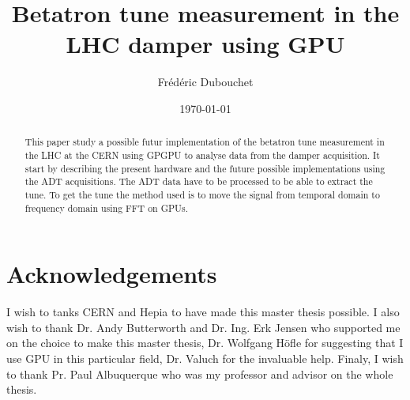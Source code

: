 \documentclass[a4paper]{report}
\title{Betatron tune measurement in the LHC damper using GPU}
\author{Fr\'ed\'eric Dubouchet}
\date{\today}
\begin{document}
\maketitle

\begin{abstract}
	This paper study a possible futur implementation of the betatron tune measurement in the \gls{LHC} at the \gls{CERN} using \gls{GPGPU} to analyse data from the \gls{damper} acquisition. It start by describing the present hardware and the future possible implementations using the \gls{ADT} acquisitions. The \gls{ADT} data have to be processed to be able to extract the \gls{tune}. To get the tune the method used is to move the signal from temporal domain to frequency domain using \gls{FFT} on \glspl{GPU}.
\end{abstract}

\chapter*{Acknowledgements}
	I wish to tanks \gls{CERN} and \gls{Hepia} to have made this master thesis possible. I also wish to thank Dr. Andy Butterworth and Dr. Ing. Erk Jensen who supported me on the choice to make this master thesis, Dr. Wolfgang H{\"o}fle for suggesting that I use GPU in this particular field, Dr. Valuch for the invaluable help. Finaly, I wish to thank Pr. Paul Albuquerque who was my professor and advisor on the whole thesis.

\tableofcontents
\listoffigures
\listoftables







\printglossaries


\end{document}
